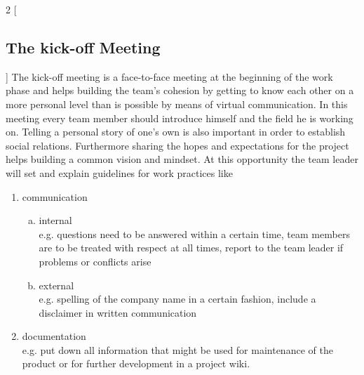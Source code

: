 \begin{multicols}{2}
[\subsection{The kick-off Meeting}]
The kick-off meeting is a face-to-face meeting at the beginning of the work phase and helps building the team’s cohesion by getting to know each other on a more personal level than is possible by means of virtual communication.
In this meeting every team member should introduce himself and the field he is working on. Telling a personal story of one's own is also important in order to establish social relations. Furthermore sharing the hopes and expectations for the project helps building a common vision and mindset.
At this opportunity the team leader will set and explain guidelines for work practices like 
 \begin{enumerate}[1.]
	\item communication
		\begin{enumerate}[a)]
		  	\item internal\\ 
				e.g. questions need to be answered within a certain time, team members are to be treated with respect at all times, report to the team leader if problems or conflicts arise
			\item external\\
				e.g. spelling of the company name in a certain fashion, include a disclaimer in written communication
		\end{enumerate}
	\item documentation\\
e.g. put down all information that might be used for maintenance of the product or for further development in a project wiki.  \end{enumerate}
\end{multicols}